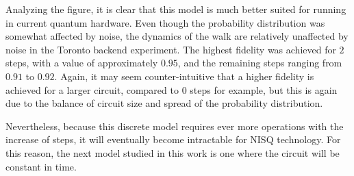 \documentclass[../../dissertation.tex]{subfiles}
\begin{document}
Analyzing the figure, it is clear that this model is much better suited for
running in current quantum hardware. Even though the probability distribution
was somewhat affected by noise, the dynamics of the walk are relatively
unaffected by noise in the Toronto backend experiment. The highest fidelity was
achieved for $2$ steps, with a value of approximately $0.95$, and the remaining
steps ranging from $0.91$ to $0.92$.  Again, it may seem counter-intuitive that
a higher fidelity is achieved for a larger circuit, compared to $0$ steps for
example, but this is again due to the balance of circuit size and spread of the
probability distribution.\par

Nevertheless, because this discrete model requires ever more operations with
the increase of steps, it will eventually become intractable for NISQ
technology. For this reason, the next model studied in this work is one where
the circuit will be constant in time.
\end{document}
